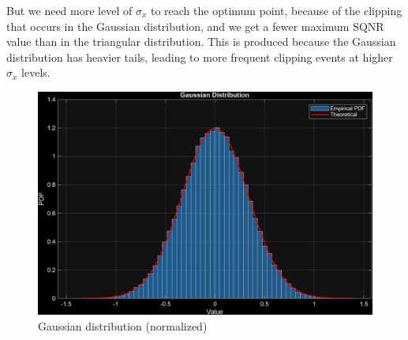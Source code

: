 \documentclass[11pt,a4paper]{article}
\begin{document}
But we need more level of $\sigma_x$ to reach the optimum point, because of the clipping that occurs in the Gaussian distribution, and we get a fewer maximum SQNR value than in the triangular distribution.
This is produced because the Gaussian distribution has heavier tails, leading to more frequent clipping events at higher $\sigma_x$ levels.

\begin{figure}[H]
    \centering
    \includegraphics[width=1\textwidth]{img/task3_normal_dist.png}
    \caption{Gaussian distribution (normalized)}
    \label{fig:task3_normal_dist}
\end{figure}
\end{document}
